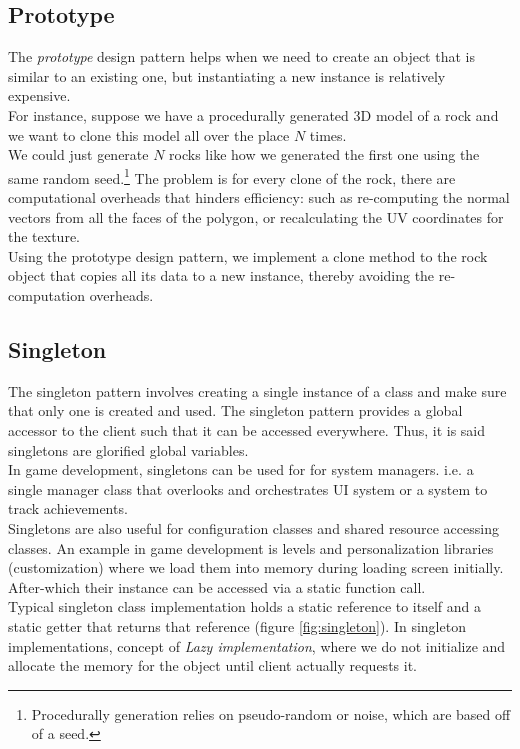 \begin{multicols}{2}
\fi

\subsection{Prototype}

The \textit{prototype} design pattern helps when we need to create an object that is similar to an existing one, but instantiating a new instance is relatively expensive.\bs
\\
For instance, suppose we have a procedurally generated 3D model of a rock and we want to clone this model all over the place $N$ times.\bs
\\
We could just generate $N$ rocks like how we generated the first one using the same random seed.\footnote{Procedurally generation relies on pseudo-random or noise, which are based off of a seed.} The problem is for every clone of the rock, there are computational overheads that hinders efficiency: such as re-computing the normal vectors from all the faces of the polygon, or recalculating the UV coordinates for the texture.\bs
\\
Using the prototype design pattern, we implement a clone method to the rock object that copies all its data to a new instance, thereby avoiding the re-computation overheads.

\subsection{Singleton}

The singleton pattern involves creating a single instance of a class and make sure that only one is created and used\cite{tp-singleton}. The singleton pattern provides a global accessor to the client such that it can be accessed everywhere. Thus, it is said singletons are glorified global variables.\cite{ood-singleton, sm-singleton}\bs
\\
In game development, singletons can be used for for system managers. i.e. a single manager class that overlooks and orchestrates UI system or a system to track achievements. 
\\
Singletons are also useful for configuration classes and shared resource accessing classes.\cite{ood-singleton} An example in game development is levels and personalization libraries (customization) where we load them into memory during loading screen initially. After-which their instance can be accessed via a static function call.\bs
\\
Typical singleton class implementation holds a static reference to itself and a static getter that returns that reference (figure \ref{fig:singleton}). In singleton implementations, concept of \textit{Lazy implementation}, where we do not initialize and allocate the memory for the object until client actually requests it.


\end{multicols}

